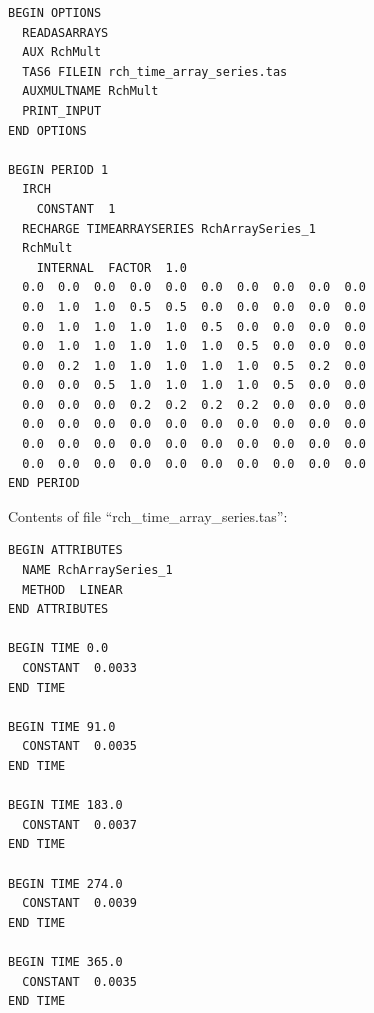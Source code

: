 \begin{lstlisting}[style=inputfile]
BEGIN OPTIONS
  READASARRAYS
  AUX RchMult 
  TAS6 FILEIN rch_time_array_series.tas
  AUXMULTNAME RchMult
  PRINT_INPUT
END OPTIONS

BEGIN PERIOD 1
  IRCH
    CONSTANT  1
  RECHARGE TIMEARRAYSERIES RchArraySeries_1
  RchMult
    INTERNAL  FACTOR  1.0
  0.0  0.0  0.0  0.0  0.0  0.0  0.0  0.0  0.0  0.0
  0.0  1.0  1.0  0.5  0.5  0.0  0.0  0.0  0.0  0.0
  0.0  1.0  1.0  1.0  1.0  0.5  0.0  0.0  0.0  0.0
  0.0  1.0  1.0  1.0  1.0  1.0  0.5  0.0  0.0  0.0
  0.0  0.2  1.0  1.0  1.0  1.0  1.0  0.5  0.2  0.0
  0.0  0.0  0.5  1.0  1.0  1.0  1.0  0.5  0.0  0.0
  0.0  0.0  0.0  0.2  0.2  0.2  0.2  0.0  0.0  0.0
  0.0  0.0  0.0  0.0  0.0  0.0  0.0  0.0  0.0  0.0
  0.0  0.0  0.0  0.0  0.0  0.0  0.0  0.0  0.0  0.0
  0.0  0.0  0.0  0.0  0.0  0.0  0.0  0.0  0.0  0.0
END PERIOD
\end{lstlisting}

Contents of file ``rch\_time\_array\_series.tas'':

\begin{lstlisting}[style=inputfile]
BEGIN ATTRIBUTES
  NAME RchArraySeries_1
  METHOD  LINEAR
END ATTRIBUTES

BEGIN TIME 0.0
  CONSTANT  0.0033
END TIME

BEGIN TIME 91.0
  CONSTANT  0.0035
END TIME

BEGIN TIME 183.0
  CONSTANT  0.0037
END TIME

BEGIN TIME 274.0
  CONSTANT  0.0039
END TIME

BEGIN TIME 365.0
  CONSTANT  0.0035
END TIME
\end{lstlisting}



